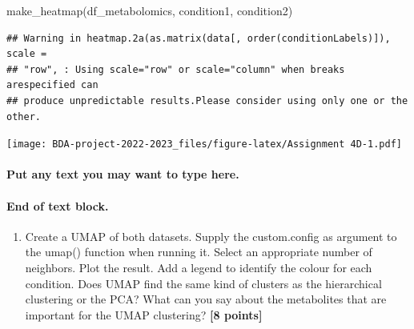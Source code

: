 \documentclass[
]{article}
\newenvironment{Shaded}{\begin{snugshade}}{\end{snugshade}}
\newcommand{\DecValTok}[1]{\textcolor[rgb]{0.00,0.00,0.81}{#1}}
\newcommand{\FunctionTok}[1]{\textcolor[rgb]{0.00,0.00,0.00}{#1}}
\newcommand{\NormalTok}[1]{#1}
\newcommand{\OtherTok}[1]{\textcolor[rgb]{0.56,0.35,0.01}{#1}}
\newcommand{\SpecialCharTok}[1]{\textcolor[rgb]{0.00,0.00,0.00}{#1}}
\providecommand{\tightlist}{%
  \setlength{\itemsep}{0pt}\setlength{\parskip}{0pt}}
\begin{document}
\begin{Shaded}
\begin{Highlighting}[]
\FunctionTok{make\_heatmap}\NormalTok{(df\_metabolomics, condition1, condition2)}
\end{Highlighting}
\end{Shaded}

\begin{verbatim}
## Warning in heatmap.2a(as.matrix(data[, order(conditionLabels)]), scale =
## "row", : Using scale="row" or scale="column" when breaks arespecified can
## produce unpredictable results.Please consider using only one or the other.
\end{verbatim}

\texttt{[image: BDA-project-2022-2023\_files/figure-latex/Assignment 4D-1.pdf]}

\hypertarget{put-any-text-you-may-want-to-type-here.-24}{%
\paragraph{Put any text you may want to type
here.}\label{put-any-text-you-may-want-to-type-here.-24}}

\hypertarget{end-of-text-block.-26}{%
\paragraph{End of text block.}\label{end-of-text-block.-26}}

\begin{enumerate}
\def\labelenumi{\Alph{enumi})}
\setcounter{enumi}{4}
\tightlist
\item
  Create a UMAP of both datasets. Supply the custom.config as argument
  to the umap() function when running it. Select an appropriate number
  of neighbors. Plot the result. Add a legend to identify the colour for
  each condition. Does UMAP find the same kind of clusters as the
  hierarchical clustering or the PCA? What can you say about the
  metabolites that are important for the UMAP clustering? \textbf{{[}8
  points{]}}
\end{enumerate}

\begin{Shaded}
\end{Shaded}
\end{document}
